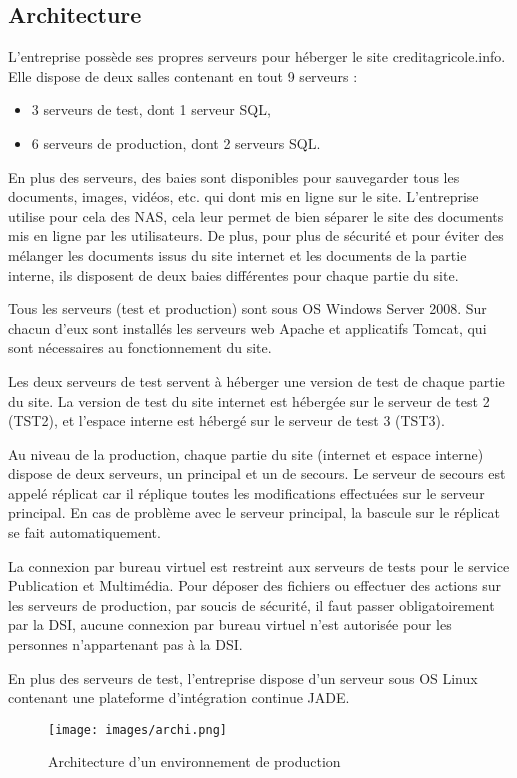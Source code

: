 \documentclass[12pt,a4paper]{article}
\begin{document}
\subsection{Architecture}
L'entreprise possède ses propres serveurs pour héberger le site creditagricole.info. Elle dispose de deux salles contenant en tout 9 serveurs :
\begin{itemize}
\item 3 serveurs de test, dont 1 serveur SQL,
\item 6 serveurs de production, dont 2 serveurs SQL.
\end{itemize}
En plus des serveurs, des baies sont disponibles pour sauvegarder tous les documents, images, vidéos, etc. qui dont mis en ligne sur le site. L'entreprise utilise pour cela des NAS, cela leur permet de bien séparer le site des documents mis en ligne par les utilisateurs. De plus, pour plus de sécurité et pour éviter des mélanger les documents issus du site internet et les documents de la partie interne, ils disposent de deux baies différentes pour chaque partie du site.\par
\medskip
Tous les serveurs (test et production) sont sous OS Windows Server 2008. Sur chacun d'eux sont installés les serveurs web Apache et applicatifs Tomcat, qui sont nécessaires au fonctionnement du site.\par
Les deux serveurs de test servent à héberger une version de test de chaque partie du site. La version de test du site internet est hébergée sur le serveur de test 2 (TST2), et l'espace interne est hébergé sur le serveur de test 3 (TST3).\par
Au niveau de la production, chaque partie du site (internet et espace interne) dispose de deux serveurs, un principal et un de secours. Le serveur de secours est appelé réplicat car il réplique toutes les modifications effectuées sur le serveur principal. En cas de problème avec le serveur principal, la bascule sur le réplicat se fait automatiquement.\par
La connexion par bureau virtuel est restreint aux serveurs de tests pour le service Publication et Multimédia. Pour déposer des fichiers ou effectuer des actions sur les serveurs de production, par soucis de sécurité, il faut passer obligatoirement par la DSI, aucune connexion par bureau virtuel n'est autorisée pour les personnes n'appartenant pas à la DSI.\par
\medskip
En plus des serveurs de test, l'entreprise dispose d'un serveur sous OS Linux contenant une plateforme d'intégration continue \gls{JADE}. 
\begin{figure}[h!]
\centering
\texttt{[image: images/archi.png]} 
\caption{Architecture d'un environnement de production}
\end{figure}
\newpage
\end{document}
